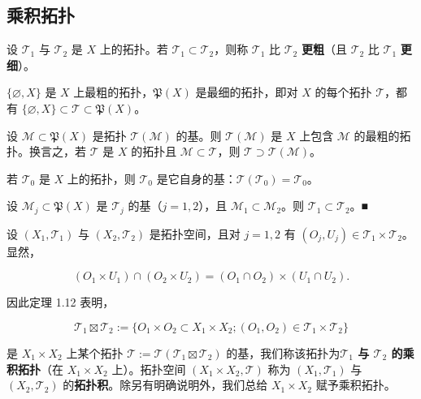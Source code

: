 \subsection*{乘积拓扑}

设 $ \mathcal{T}_1 $ 与 $ \mathcal{T}_2 $ 是 $ X $ 上的拓扑。若 $ \mathcal{T}_1 \subset \mathcal{T}_2 $，则称 $ \mathcal{T}_1 $ 比 $ \mathcal{T}_2 $ \textbf{更粗}（且 $ \mathcal{T}_2 $ 比 $ \mathcal{T}_1 $ \textbf{更细}）。

\begin{remark}

\begin{items}
\item

$ \{\varnothing, X\} $ 是 $ X $ 上最粗的拓扑，$ \mathfrak{P}(X) $ 是最细的拓扑，即对 $ X $ 的每个拓扑 $ \mathcal{T} $，都有 $ \{\varnothing, X\} \subset \mathcal{T} \subset \mathfrak{P}(X) $。

\item

设 $ \mathcal{M} \subset \mathfrak{P}(X) $ 是拓扑 $ \mathcal{T}(\mathcal{M}) $ 的基。则 $ \mathcal{T}(\mathcal{M}) $ 是 $ X $ 上包含 $ \mathcal{M} $ 的最粗的拓扑。换言之，若 $ \mathcal{T} $ 是 $ X $ 的拓扑且 $ \mathcal{M} \subset \mathcal{T} $，则 $ \mathcal{T} \supset \mathcal{T}(\mathcal{M}) $。

\item

若 $ \mathcal{T}_0 $ 是 $ X $ 上的拓扑，则 $ \mathcal{T}_0 $ 是它自身的基：$ \mathcal{T}(\mathcal{T}_0) = \mathcal{T}_0 $。

\item

设 $ \mathcal{M}_j \subset \mathfrak{P}(X) $ 是 $ \mathcal{T}_j $ 的基（$ j = 1, 2 $），且 $ \mathcal{M}_1 \subset \mathcal{M}_2 $。则 $ \mathcal{T}_1 \subset \mathcal{T}_2 $。\nobreak\hspace{0.35em}■

\end{items}

设 $ (X_1, \mathcal{T}_1) $ 与 $ (X_2, \mathcal{T}_2) $ 是拓扑空间，且对 $ j = 1, 2 $ 有 $ (O_j, U_j) \in \mathcal{T}_1 \times \mathcal{T}_2 $。显然，

\[
(O_1 \times U_1) \cap (O_2 \times U_2) = (O_1 \cap O_2) \times (U_1 \cap U_2) .
\]

因此定理 1.12 表明，

\[
\mathcal{T}_1 \boxtimes \mathcal{T}_2 := \{ O_1 \times O_2 \subset X_1 \times X_2 ; (O_1, O_2) \in \mathcal{T}_1 \times \mathcal{T}_2 \}
\]

是 $ X_1 \times X_2 $ 上某个拓扑 $ \mathcal{T} := \mathcal{T}(\mathcal{T}_1 \boxtimes \mathcal{T}_2) $ 的基，我们称该拓扑为\textbf{$ \mathcal{T}_1 $ 与 $ \mathcal{T}_2 $ 的乘积拓扑}（在 $ X_1 \times X_2 $ 上）。拓扑空间 $ (X_1 \times X_2, \mathcal{T}) $ 称为 $ (X_1, \mathcal{T}_1) $ 与 $ (X_2, \mathcal{T}_2) $ 的\textbf{拓扑积}。除另有明确说明外，我们总给 $ X_1 \times X_2 $ 赋予乘积拓扑。

\end{remark}

